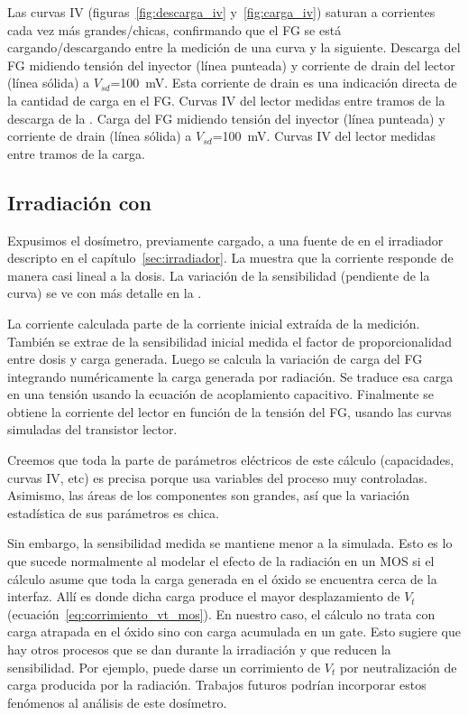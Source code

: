Las curvas IV (figuras~\ref{fig:descarga_iv}
y~\ref{fig:carga_iv}) saturan a corrientes cada vez más grandes/chicas,
confirmando que el FG se está cargando/descargando 
entre la medición de una curva y la siguiente.
{Descarga del FG midiendo tensión del inyector (línea punteada) y
corriente de drain del lector (línea sólida) a
$V_{sd}$=\SI{100}{\milli\volt}.
Esta corriente de drain es una indicación directa 
de la cantidad de carga en el FG.}
{Curvas IV del lector medidas entre tramos de la descarga
    de la .}
{Carga del FG midiendo tensión del inyector (línea punteada) y
corriente de drain (línea sólida) a
$V_{sd}$=\SI{100}{\milli\volt}.}
{Curvas IV del lector medidas entre tramos de la carga.}
\subsection{Irradiación con \Strontium}
Expusimos el dosímetro,
previamente cargado,
a una fuente de \Strontium
en el irradiador descripto en el capítulo~\ref{sec:irradiador}.
La  muestra que la corriente responde de
manera casi lineal a la dosis.
La variación de la sensibilidad (pendiente de la curva)
se ve con más detalle en la .

La corriente calculada parte de la corriente inicial extraída de la medición.
También se extrae de la sensibilidad inicial medida el factor de proporcionalidad entre dosis y carga generada.
Luego se calcula la variación de carga del FG
integrando numéricamente la carga generada por radiación.
Se traduce esa carga en una tensión
usando la ecuación de acoplamiento capacitivo.
Finalmente se obtiene la corriente del lector
en función de la tensión del FG,
usando las curvas simuladas del transistor lector.

Creemos que toda la parte de parámetros eléctricos de este cálculo
(capacidades, curvas IV, etc) es precisa
porque usa variables del proceso muy controladas.
Asimismo, las áreas de los componentes son grandes,
así que la variación estadística de sus parámetros es chica.

Sin embargo, la sensibilidad medida se mantiene menor a la simulada.
Esto es lo que sucede normalmente al modelar el efecto de la radiación en un MOS si el cálculo asume que toda la carga generada en el óxido se encuentra cerca de la interfaz. 
Allí es donde dicha carga produce el mayor desplazamiento de $V_t$ (ecuación~\ref{eq:corrimiento_vt_mos}).
En nuestro caso, el cálculo no trata con carga atrapada en el óxido sino con carga acumulada en un gate.
Esto sugiere que hay otros procesos que se dan durante la irradiación y que reducen la sensibilidad.
Por ejemplo, puede darse un corrimiento de $V_t$ por neutralización de carga producida por la radiación\cite{faigon_extension_2008}\cite{fleetwood_radiation-induced_1990}.
Trabajos futuros podrían incorporar estos fenómenos al análisis de este dosímetro.

